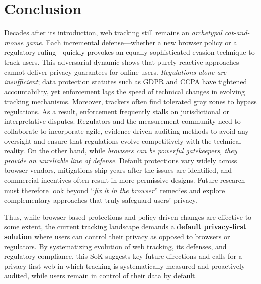 \section{Conclusion}

Decades after its introduction, web tracking still remains an \textit{archetypal cat-and-mouse game}.
%
Each incremental defense---whether a new browser policy or a regulatory ruling---quickly provokes an equally sophisticated evasion technique to track users.
%
This adversarial dynamic shows that purely reactive approaches cannot deliver privacy guarantees for online users.
%
\textit{Regulations alone are insufficient}; data protection statutes such as GDPR and CCPA have tightened accountability, yet enforcement lags the speed of technical changes in evolving tracking mechanisms.
%
Moreover, trackers often find tolerated gray zones to bypass regulations.
%
As a result, enforcement frequently stalls on jurisdictional or interpretative disputes.
%
Regulators and the measurement community need to collaborate to incorporate agile, evidence-driven auditing methods to avoid any oversight and ensure that regulations evolve competitively with the technical reality.
%
On the other hand, while \textit{browsers can be powerful gatekeepers, they provide an unreliable line of defense}.
%
Default protections vary widely across browser vendors, mitigations ship years after the issues are identified, and commercial incentives often result in more permissive designs.
%
Future research must therefore look beyond ``\textit{fix it in the browser}'' remedies and explore complementary approaches that truly safeguard users' privacy.

Thus, while browser-based protections and policy-driven changes are effective to some extent, the current tracking landscape demands a \textbf{default privacy-first solution} where users can control their privacy as opposed to browsers or regulators.
%
By systematizing evolution of web tracking, its defenses, and regulatory compliance, this SoK suggests key future directions and calls for a privacy-first web in which tracking is systematically measured and proactively audited, while users remain in control of their data by default.
